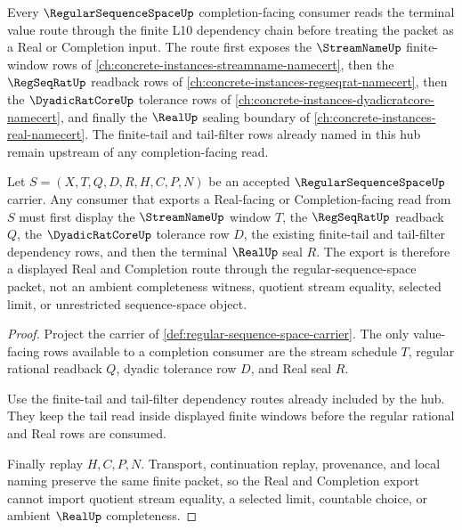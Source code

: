 Every $\RegularSequenceSpaceUp$ completion-facing consumer reads the terminal value route through the finite L10 dependency chain before treating the packet as a Real or Completion input. The route first exposes the $\StreamNameUp$ finite-window rows of \autoref{ch:concrete-instances-streamname-namecert}, then the $\RegSeqRatUp$ readback rows of \autoref{ch:concrete-instances-regseqrat-namecert}, then the $\DyadicRatCoreUp$ tolerance rows of \autoref{ch:concrete-instances-dyadicratcore-namecert}, and finally the $\RealUp$ sealing boundary of \autoref{ch:concrete-instances-real-namecert}. The finite-tail and tail-filter rows already named in this hub remain upstream of any completion-facing read.

\begin{theorem}
\label{thm:regular-sequence-space-real-completion-dependency-route}
Let $S=(X,T,Q,D,R,H,C,P,N)$ be an accepted $\RegularSequenceSpaceUp$ carrier. Any consumer that exports a Real-facing or Completion-facing read from $S$ must first display the $\StreamNameUp$ window $T$, the $\RegSeqRatUp$ readback $Q$, the $\DyadicRatCoreUp$ tolerance row $D$, the existing finite-tail and tail-filter dependency rows, and then the terminal $\RealUp$ seal $R$. The export is therefore a displayed Real and Completion route through the regular-sequence-space packet, not an ambient completeness witness, quotient stream equality, selected limit, or unrestricted sequence-space object.
\end{theorem}
\begin{proof}
Project the carrier of \autoref{def:regular-sequence-space-carrier}. The only value-facing rows available to a completion consumer are the stream schedule $T$, regular rational readback $Q$, dyadic tolerance row $D$, and Real seal $R$.

Use the finite-tail and tail-filter dependency routes already included by the hub. They keep the tail read inside displayed finite windows before the regular rational and Real rows are consumed.

Finally replay $H,C,P,N$. Transport, continuation replay, provenance, and local naming preserve the same finite packet, so the Real and Completion export cannot import quotient stream equality, a selected limit, countable choice, or ambient $\RealUp$ completeness.
\end{proof}
